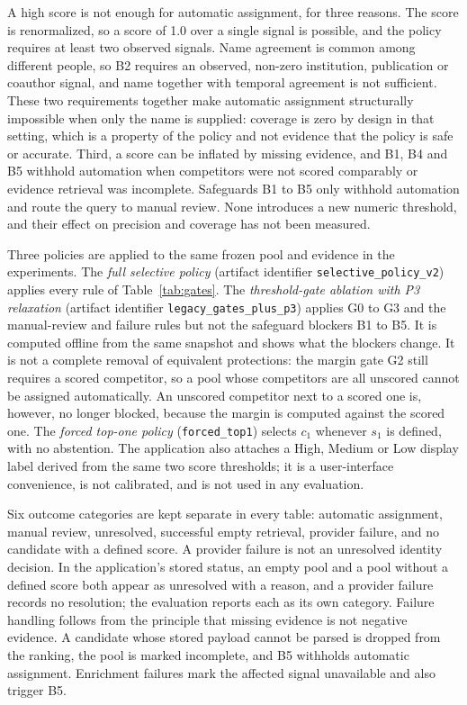 A high score is not enough for automatic assignment, for three reasons. The score is renormalized, so a score of 1.0 over a single signal is possible, and the policy requires at least two observed signals. Name agreement is common among different people, so B2 requires an observed, non-zero institution, publication or coauthor signal, and name together with temporal agreement is not sufficient. These two requirements together make automatic assignment structurally impossible when only the name is supplied: coverage is zero by design in that setting, which is a property of the policy and not evidence that the policy is safe or accurate. Third, a score can be inflated by missing evidence, and B1, B4 and B5 withhold automation when competitors were not scored comparably or evidence retrieval was incomplete. Safeguards B1 to B5 only withhold automation and route the query to manual review. None introduces a new numeric threshold, and their effect on precision and coverage has not been measured.

Three policies are applied to the same frozen pool and evidence in the experiments. The \emph{full selective policy} (artifact identifier \texttt{selective\_policy\_v2}) applies every rule of Table~\ref{tab:gates}. The \emph{threshold-gate ablation with P3 relaxation} (artifact identifier \texttt{legacy\_gates\_plus\_p3}) applies G0 to G3 and the manual-review and failure rules but not the safeguard blockers B1 to B5. It is computed offline from the same snapshot and shows what the blockers change. It is not a complete removal of equivalent protections: the margin gate G2 still requires a scored competitor, so a pool whose competitors are all unscored cannot be assigned automatically. An unscored competitor next to a scored one is, however, no longer blocked, because the margin is computed against the scored one. The \emph{forced top-one policy} (\texttt{forced\_top1}) selects $c_1$ whenever $s_1$ is defined, with no abstention. The application also attaches a High, Medium or Low display label derived from the same two score thresholds; it is a user-interface convenience, is not calibrated, and is not used in any evaluation.

Six outcome categories are kept separate in every table: automatic assignment, manual review, unresolved, successful empty retrieval, provider failure, and no candidate with a defined score. A provider failure is not an unresolved identity decision. In the application's stored status, an empty pool and a pool without a defined score both appear as unresolved with a reason, and a provider failure records no resolution; the evaluation reports each as its own category. Failure handling follows from the principle that missing evidence is not negative evidence. A candidate whose stored payload cannot be parsed is dropped from the ranking, the pool is marked incomplete, and B5 withholds automatic assignment. Enrichment failures mark the affected signal unavailable and also trigger B5.

